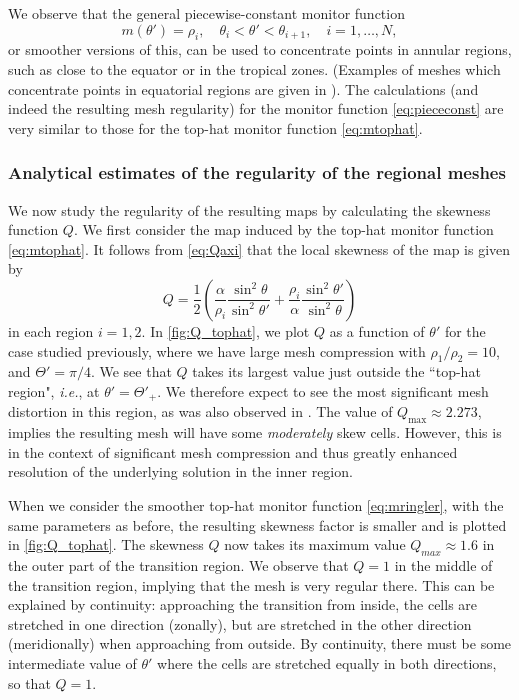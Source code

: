 \documentclass[11pt, a4paper]{scrartcl}  %
\theoremstyle{plain}
\theoremstyle{definition}
\numberwithin{equation}{section}
\begin{document}
We observe that the general piecewise-constant monitor function
\begin{equation}
\label{eq:piececonst}
m(\theta') = \rho_i, \quad \theta_i < \theta' < \theta_{i+1}, \quad i = 1, \ldots, N,
\end{equation}
or smoother versions of this, can be used to concentrate points in
annular regions, such as close to the equator or in the tropical zones.
(Examples of meshes which concentrate points in equatorial regions
are given in \citet{iga2017equatorially}).
The calculations (and indeed the resulting mesh regularity) for the
monitor function \cref{eq:piececonst} are very similar to those for the
top-hat monitor function \cref{eq:mtophat}.

\subsubsection{Analytical estimates of the regularity of the regional meshes}

We now study the regularity of the resulting maps by calculating the
skewness function $Q$. We first consider the map induced by the top-hat
monitor function \cref{eq:mtophat}. It follows from \cref{eq:Qaxi} that
the local skewness of the map is given by
\begin{equation}
Q = \frac{1}{2} \left(\frac{\alpha}{\rho_i} \frac{\sin^2\theta}{\sin^2\theta'} + \frac{\rho_i}{\alpha}\frac{\sin^2\theta'}{\sin^2\theta} \right)
\end{equation}
in each region $i=1,2$. In \cref{fig:Q_tophat}, we plot $Q$ as a
function of $\theta'$ for the case studied previously, where we have
large mesh compression with $\rho_1/\rho_2 = 10$, and $\Theta' = \pi/4$.
We see that $Q$ takes its largest value just
outside the ``top-hat region", \emph{i.e.}, at $\theta' = \Theta'_+$. We
therefore expect to see the most significant mesh distortion in this
region, as was also observed in \citet{weller2016mesh}. The value of
$Q_\mathrm{max} \approx 2.273$, implies the resulting mesh will have
some \emph{moderately} skew cells. However, this is in the context of
significant mesh compression and thus greatly enhanced resolution of the
underlying solution in the inner region.

When we consider the smoother top-hat monitor function
\cref{eq:mringler}, with the same parameters as before, the resulting
skewness factor is smaller and is plotted in \cref{fig:Q_tophat}. The
skewness $Q$ now takes its maximum value $Q_{max} \approx 1.6$ in the
outer part of the transition region. We observe that $Q = 1$ in the
middle of the transition region, implying that the mesh is very regular
there. This can be explained by continuity: approaching the transition
from inside, the cells are stretched in one direction (zonally), but are
stretched in the other direction (meridionally) when approaching from
outside. By continuity, there must be some intermediate value of
$\theta'$ where the cells are stretched equally in both directions, so
that $Q = 1$.
\end{document}
